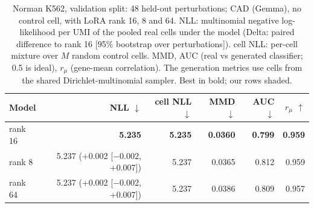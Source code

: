 \begin{table}[htbp]
\centering
\small
\setlength{\tabcolsep}{4pt}
\begin{tabular}{lrrrrr}
\toprule
Model & NLL $\downarrow$ & cell NLL $\downarrow$ & MMD $\downarrow$ & AUC $\downarrow$ & $r_\mu$ $\uparrow$ \\
\midrule
\rowcolor{ours}rank 16 & \textbf{5.235} & \textbf{5.235} & \textbf{0.0360} & \textbf{0.799} & \textbf{0.959} \\
\rowcolor{ours}rank 8 & 5.237 (+0.002 [$-$0.002, +0.007]) & 5.237 & 0.0365 & 0.812 & 0.959 \\
\rowcolor{ours}rank 64 & 5.237 (+0.002 [$-$0.002, +0.007]) & 5.237 & 0.0386 & 0.809 & 0.957 \\
\bottomrule
\end{tabular}
\caption{Norman K562, validation split: 48 held-out perturbations; CAD (Gemma), no control cell, with LoRA rank 16, 8 and 64. NLL: multinomial negative log-likelihood per UMI of the pooled real cells under the model (Delta: paired difference to rank 16 [95\% bootstrap over perturbations]). cell NLL: per-cell mixture over $M$ random control cells. MMD, AUC (real vs generated classifier; 0.5 is ideal), $r_\mu$ (gene-mean correlation). The generation metrics use cells from the shared Dirichlet-multinomial sampler. Best in bold; our rows shaded.}
\label{tab:val_pert_lora}
\end{table}